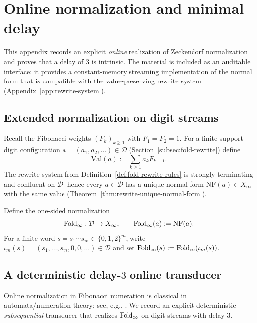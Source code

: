 \section{Online normalization and minimal delay}\label{app:online-normalization}

This appendix records an explicit \emph{online} realization of Zeckendorf normalization and proves that a delay of $3$ is intrinsic.
The material is included as an auditable interface: it provides a constant-memory streaming implementation of the normal form that is compatible with the value-preserving rewrite system (Appendix~\ref{app:rewrite-system}).

\subsection{Extended normalization on digit streams}\label{app:online-norm-setup}
Recall the Fibonacci weights $(F_k)_{k\ge 1}$ with $F_1=F_2=1$.
For a finite-support digit configuration $a=(a_1,a_2,\dots)\in\mathcal{D}$ (Section~\ref{subsec:fold-rewrite}) define
\[
\mathrm{Val}(a):=\sum_{k\ge 1} a_k F_{k+1}.
\]
The rewrite system from Definition~\ref{def:fold-rewrite-rules} is strongly terminating and confluent on $\mathcal{D}$, hence every $a\in\mathcal{D}$ has a unique normal form $\mathrm{NF}(a)\in X_\infty$ with the same value (Theorem~\ref{thm:rewrite-unique-normal-form}).

\begin{definition}\label{def:fold-infty}
Define the one-sided normalization
\[
\mathrm{Fold}_\infty:\mathcal{D}\to X_\infty,\qquad \mathrm{Fold}_\infty(a):=\mathrm{NF}(a).
\]
For a finite word $s=s_1\cdots s_m\in\{0,1,2\}^m$, write $\iota_m(s)=(s_1,\dots,s_m,0,0,\dots)\in\mathcal{D}$ and set $\mathrm{Fold}_\infty(s):=\mathrm{Fold}_\infty(\iota_m(s))$.
\end{definition}

\subsection{A deterministic delay-$3$ online transducer}\label{app:online-delay-3-transducer}
Online normalization in Fibonacci numeration is classical in automata/numeration theory; see, e.g., \cite{Frougny1992NumbersAutomata,Frougny1999OnlineAddition}.
We record an explicit deterministic \emph{subsequential} transducer that realizes $\mathrm{Fold}_\infty$ on digit streams with delay $3$.

